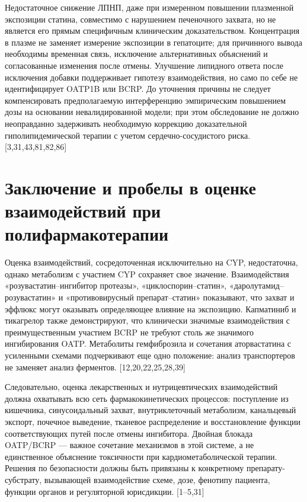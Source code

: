 \documentclass[11pt]{article}
\begin{document}
Недостаточное снижение ЛПНП, даже при измеренном повышении плазменной экспозиции статина, совместимо с нарушением печеночного захвата, но не является его прямым специфичным клиническим доказательством. Концентрация в плазме не заменяет измерение экспозиции в гепатоците; для причинного вывода необходимы временная связь, исключение альтернативных объяснений и согласованные изменения после отмены. Улучшение липидного ответа после исключения добавки поддерживает гипотезу взаимодействия, но само по себе не идентифицирует OATP1B или BCRP. До уточнения причины не следует компенсировать предполагаемую интерференцию эмпирическим повышением дозы на основании невалидированной модели; при этом обследование не должно неоправданно задерживать необходимую коррекцию доказательной гиполипидемической терапии с учетом сердечно-сосудистого риска. [3,31,43,81,82,86]

\section{Заключение и пробелы в оценке взаимодействий при полифармакотерапии}

Оценка взаимодействий, сосредоточенная исключительно на CYP, недостаточна, однако метаболизм с участием CYP сохраняет свое значение. Взаимодействия «розувастатин--ингибитор протеазы», «циклоспорин--статин», «даролутамид--розувастатин» и «противовирусный препарат--статин» показывают, что захват и эффлюкс могут оказывать определяющее влияние на экспозицию. Капматиниб и тикагрелор также демонстрируют, что клинически значимые взаимодействия с преимущественным участием BCRP не требуют столь же значимого ингибирования OATP. Метаболиты гемфиброзила и сочетания аторвастатина с усиленными схемами подчеркивают еще одно положение: анализ транспортеров не заменяет анализ ферментов. [12,20,22,25,28,39]

Следовательно, оценка лекарственных и нутрицевтических взаимодействий должна охватывать всю сеть фармакокинетических процессов: поступление из кишечника, синусоидальный захват, внутриклеточный метаболизм, канальцевый экспорт, почечное выведение, тканевое распределение и восстановление функции соответствующих путей после отмены ингибитора. Двойная блокада OATP/BCRP --- важное сочетание механизмов в этой системе, а не единственное объяснение токсичности при кардиометаболической терапии. Решения по безопасности должны быть привязаны к конкретному препарату-субстрату, вызывающей взаимодействие схеме, дозе, фенотипу пациента, функции органов и регуляторной юрисдикции. [1--5,31]
\end{document}
